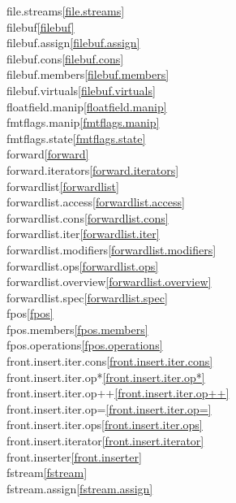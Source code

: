 \begin{multicols}{2}
file.streams\quad\ref{file.streams}\\
filebuf\quad\ref{filebuf}\\
filebuf.assign\quad\ref{filebuf.assign}\\
filebuf.cons\quad\ref{filebuf.cons}\\
filebuf.members\quad\ref{filebuf.members}\\
filebuf.virtuals\quad\ref{filebuf.virtuals}\\
floatfield.manip\quad\ref{floatfield.manip}\\
fmtflags.manip\quad\ref{fmtflags.manip}\\
fmtflags.state\quad\ref{fmtflags.state}\\
forward\quad\ref{forward}\\
forward.iterators\quad\ref{forward.iterators}\\
forwardlist\quad\ref{forwardlist}\\
forwardlist.access\quad\ref{forwardlist.access}\\
forwardlist.cons\quad\ref{forwardlist.cons}\\
forwardlist.iter\quad\ref{forwardlist.iter}\\
forwardlist.modifiers\quad\ref{forwardlist.modifiers}\\
forwardlist.ops\quad\ref{forwardlist.ops}\\
forwardlist.overview\quad\ref{forwardlist.overview}\\
forwardlist.spec\quad\ref{forwardlist.spec}\\
fpos\quad\ref{fpos}\\
fpos.members\quad\ref{fpos.members}\\
fpos.operations\quad\ref{fpos.operations}\\
front.insert.iter.cons\quad\ref{front.insert.iter.cons}\\
front.insert.iter.op*\quad\ref{front.insert.iter.op*}\\
front.insert.iter.op++\quad\ref{front.insert.iter.op++}\\
front.insert.iter.op=\quad\ref{front.insert.iter.op=}\\
front.insert.iter.ops\quad\ref{front.insert.iter.ops}\\
front.insert.iterator\quad\ref{front.insert.iterator}\\
front.inserter\quad\ref{front.inserter}\\
fstream\quad\ref{fstream}\\
fstream.assign\quad\ref{fstream.assign}\\

\end{multicols}
